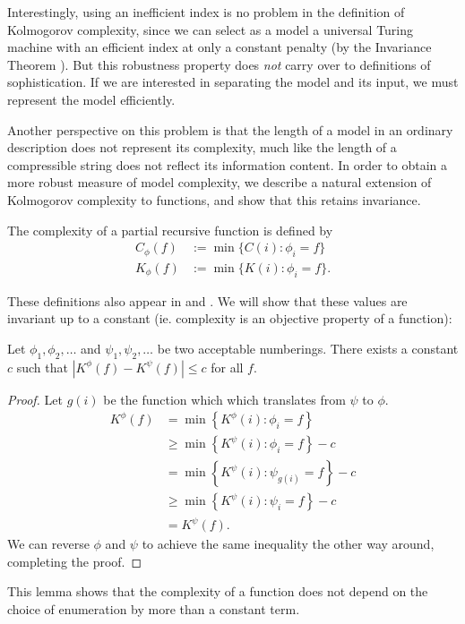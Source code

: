 \documentclass{style/llncs}
\begin{document}
Interestingly, using an inefficient index is no problem in the definition of Kolmogorov complexity, since we can select as a model a universal Turing machine with an efficient index at only a constant penalty (by the Invariance Theorem \cite{li1993introduction}). But this robustness property does \emph{not} carry over to definitions of sophistication. If we are interested in separating the model and its input, we must represent the model efficiently. 

Another perspective on this problem is that the length of a model in an ordinary description does not represent its complexity, much like the length of a compressible string does not reflect its information content. In order to obtain a more robust measure of model complexity, we describe a natural extension of Kolmogorov complexity to functions, and show that this retains invariance.

\begin{definition}
  The complexity of a partial recursive function is defined by
  \begin{align*}
    C_\phi(f) &:= \min\{C(i):\phi_i=f\}\\
    K_\phi(f) &:= \min\{K(i):\phi_i=f\}.
  \end{align*} \label{definition:model-complexity}
\end{definition}
These definitions also appear in \cite{grunwald2004shannon} and \cite{vitanyi2004meaningful}. We will show that these values are invariant up to a constant (ie. complexity is an objective property of a function):
\begin{lemma}[Invariance]
Let $\phi_1, \phi_2, \ldots$ and $\psi_1, \psi_2,\ldots$ be two acceptable numberings. There exists a constant $c$ such that $\left| K^\phi(f) - K^\psi(f)\right | \leq c$ for all $f$. \label{lemma:invariance}
\end{lemma}
\begin{proof}
Let $g(i)$ be the function which which translates from $\psi$ to $\phi$.
\begin{align*}
K^\phi(f) &= \min\left\{ K^\phi(i) : \phi_i= f\right\} \\
&\geq \min\left\{ K^\psi(i) : \phi_i= f\right\} - c\\
&= \min\left\{ K^\psi(i) : \psi_{g(i)}= f\right\} - c\\
&\geq \min\left\{ K^\psi(i) : \psi_i= f\right\} - c\\
&= K^\psi(f).
\end{align*}
We can reverse $\phi$ and $\psi$ to achieve the same inequality the other way around, completing the proof.
\end{proof}
This lemma shows that the complexity of a function does not depend on the choice of
enumeration by more than a constant term.
\end{document}
